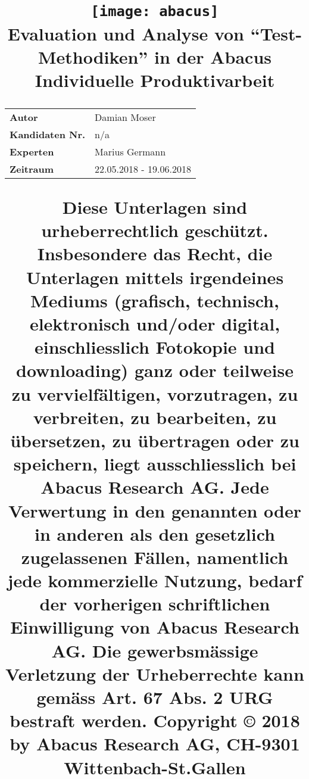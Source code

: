 \documentclass{article}
\title{
\vspace{0.8in}
\texttt{[image: abacus]}
\vspace{0.5in}\Huge{\textbf{\titleOfDocument}}\\
\vspace{0.3in}\large{\textbf{Evaluation und Analyse von \enquote{Test-Methodiken} in der Abacus}}\\
\large{Individuelle Produktivarbeit}\\
\vspace{1in}
\begin{table}[h]
\centering
\begin{tabular}{ll}
\textbf{Autor}          & Damian Moser            \\
\textbf{Kandidaten Nr.} & n/a                     \\
\textbf{Experten}       & Marius Germann          \\
\textbf{Zeitraum}       & 22.05.2018 - 19.06.2018
\end{tabular}
\end{table}
\vspace{0.6in}
\begin{footnotesize}
\begin{flushleft}
Diese Unterlagen sind urheberrechtlich geschützt. \\
Insbesondere das Recht, die Unterlagen mittels irgendeines Mediums (grafisch, technisch, elektronisch und/oder
digital, einschliesslich Fotokopie und downloading) ganz oder teilweise zu vervielfältigen, vorzutragen, zu verbreiten,
zu bearbeiten, zu übersetzen, zu übertragen oder zu speichern, liegt ausschliesslich bei Abacus Research AG.
Jede Verwertung in den genannten oder in anderen als den gesetzlich zugelassenen Fällen, namentlich jede
kommerzielle Nutzung, bedarf der vorherigen schriftlichen Einwilligung von Abacus Research AG.
Die gewerbsmässige Verletzung der Urheberrechte kann gemäss Art. 67 Abs. 2 URG bestraft werden.
Copyright © 2018 by Abacus Research AG, CH-9301 Wittenbach-St.Gallen
\end{flushleft}
\end{footnotesize}
}
\author{}
\date{} %
\begin{document}
\maketitle



\newpage
\tableofcontents
\newpage





\clearpage
\listoffigures
\pagebreak
\listoftables
\pagebreak



\end{document}
